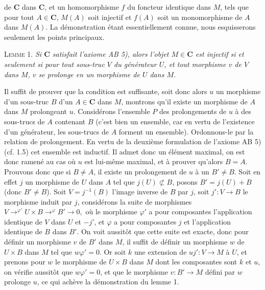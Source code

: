 
\noindent de $\mathbf{C}$ dans $\mathbf{C}$, et un homomorphisme $f$ du foncteur identique dans
$M$, tels que pour tout $A\in \mathbf{C}$, $M(A)$ soit injectif et $f(A)$ soit un
monomorphisme de $A$ dans $M(A)$. La démonstration étant essentiellement
connue, nous esquisserons seulement les points principaux.

\textsc{Lemme 1.} \textit{Si $\mathbf{C}$ satisfait l'axiome \textup{AB 5)}, alors
l'objet $M\in \mathbf{C}$ est injectif si et seulement si pour tout sous-truc $V$ du
générateur $U$, et tout morphisme $v$ de $V$ dans $M$, $v$ se prolonge en un
morphisme de $U$ dans $M$.}

Il suffit de prouver que la condition est suffisante, soit donc alors $u$ un
morphisme d'un sous-truc $B$ d'un $A\in \mathbf{C}$ dans $M$, montrons qu'il existe un
morphisme de $A$ dans $M$ prolongeant $u$. Considérons l'ensemble $P$ des
prolongements de $u$ à des sous-trucs de $A$ contenant $B$ (c'est bien un
ensemble, car en vertu de l'existence d'un générateur, les sous-trucs de $A$
forment un ensemble). Ordonnons-le par la relation de prolongement. En vertu
de la deuxième formulation de l'axiome AB 5) (cf. 1.5) cet ensemble est
inductif. Il admet donc un élément maximal, on est donc ramené au cas où $u$
est lui-même maximal, et à prouver qu'alors $B=A$.
Prouvons donc que si $B\neq A$, il existe un prolongement de $u$ à un
$B'\neq B$. Soit en effet $j$ un morphisme de $U$ dans $A$ tel que
$j(U)\not\subset B$, posons $B'=j(U)+B$ (donc $B'\neq B$). Soit
$V=j^{-1}(B)$ l'image inverse de $B$ par $j$, soit
$j':V\to B$ le morphisme induit par $j$, considérons la suite de
morphismes
$V\mathrel{\mathop{\to}^{\varphi'}}U\times B  \mathrel{\mathop{\to}^{\varphi}}B'\to0,$ où le morphisme $\varphi'$ a pour composantes l'application
identique de $V$ dans $U$ et $-j'$, et $\varphi$ a pour composantes $j$ et
l'application identique de $B$ dans $B'$. On voit aussitôt que cette suite est
exacte, donc pour définir un morphisme $v$ de $B'$ dans $M$, il suffit de
définir un morphisme $w$ de $U\times B$ dans $M$ tel que
$w\varphi'=0$. Or soit $k$ une extension de $uj':V\to M$ à $U$,
et prenons pour $w$ le morphisme de $U\times B$ dans $M$ dont les composantes
sont $k$ et $u$, on vérifie aussitôt que $w\varphi'=0$, et que le morphisme
$v:B'\to M$ défini par $w$ prolonge $u$, ce qui achève la
démonstration du lemme 1.

